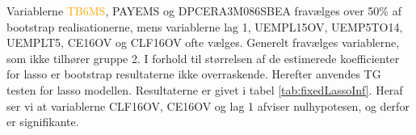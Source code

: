 Variablerne \textcolor{orange}{TB6MS}, \textcolor{blue3}{PAYEMS} og \textcolor{red3}{DPCERA3M086SBEA} fravælges over 50\% af bootstrap realisationerne, mens variablerne  \textcolor{blue3}{lag 1}, \textcolor{blue3}{UEMPL15OV}, \textcolor{blue3}{UEMP5TO14}, \textcolor{blue3}{UEMPLT5}, \textcolor{blue3}{CE16OV} og \textcolor{blue3}{CLF16OV} ofte vælges.
Generelt fravælges variablerne, som ikke tilhører gruppe 2.
I forhold til størrelsen af de estimerede koefficienter for lasso er bootstrap resultaterne ikke overraskende. 
%
%
Herefter anvendes TG testen for lasso modellen.
Resultaterne er givet i tabel \ref{tab:fixedLassoInf}.
Heraf ser vi at variablerne \textcolor{blue3}{CLF16OV}, \textcolor{blue3}{CE16OV} og \textcolor{blue3}{lag 1} afviser nulhypotesen, og derfor er signifikante.
%

%

\newpage
%
%



\newpage